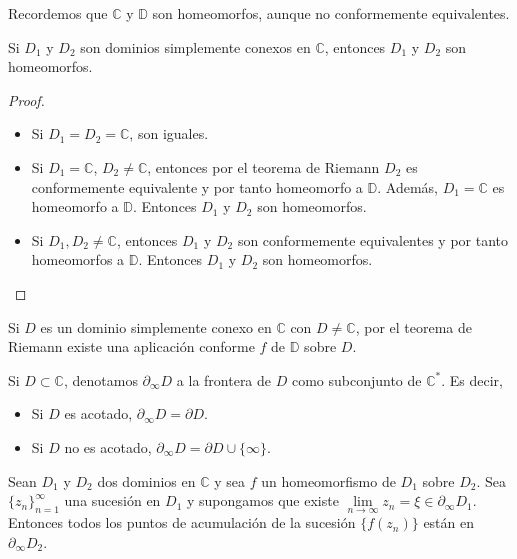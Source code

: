 Recordemos que $\mathbb{C}$ y $\mathbb{D}$ son homeomorfos, aunque no conformemente equivalentes.

\begin{corollary}
    Si $D_1$ y $D_2$ son dominios simplemente conexos en $\mathbb{C}$, entonces $D_1$ y $D_2$ son homeomorfos.
\end{corollary}

\begin{proof}
    \hfill
    \begin{itemize}
        \item Si $D_1 = D_2 = \mathbb{C}$, son iguales.
        \item Si $D_1 = \mathbb{C}$, $D_2 \neq \mathbb{C}$, entonces por el teorema de Riemann $D_2$ es conformemente equivalente y por tanto homeomorfo a $\mathbb{D}$.
              Además, $D_1 = \mathbb{C}$ es homeomorfo a $\mathbb{D}$.
              Entonces $D_1$ y $D_2$ son homeomorfos.
        \item Si $D_1, D_2 \neq \mathbb{C}$, entonces $D_1$ y $D_2$ son conformemente equivalentes y por tanto homeomorfos a $\mathbb{D}$.
              Entonces $D_1$ y $D_2$ son homeomorfos.
    \end{itemize}
\end{proof}

Si $D$ es un dominio simplemente conexo en $\mathbb{C}$ con $D \neq \mathbb{C}$, por el teorema de Riemann existe una aplicación conforme $f$ de $\mathbb{D}$ sobre $D$.

\begin{notation}
    Si $D \subset \mathbb{C}$, denotamos $\partial_\infty D$ a la frontera de $D$ como subconjunto de $\mathbb{C}^\ast$.
    Es decir,
    \begin{itemize}
        \item Si $D$ es acotado, $\partial_\infty D = \partial D$.
        \item Si $D$ no es acotado, $\partial_\infty D = \partial D \cup \{\infty\}$.
    \end{itemize}
\end{notation}

\begin{proposition}
    Sean $D_1$ y $D_2$ dos dominios en $\mathbb{C}$ y sea $f$ un homeomorfismo de $D_1$ sobre $D_2$.
    Sea $\{z_n\}_{n=1}^\infty$ una sucesión en $D_1$ y supongamos que existe $\lim\limits_{n \to \infty} z_n = \xi \in \partial_\infty D_1$.
    Entonces todos los puntos de acumulación de la sucesión $\{f(z_n)\}$ están en $\partial_\infty D_2$.
\end{proposition}


